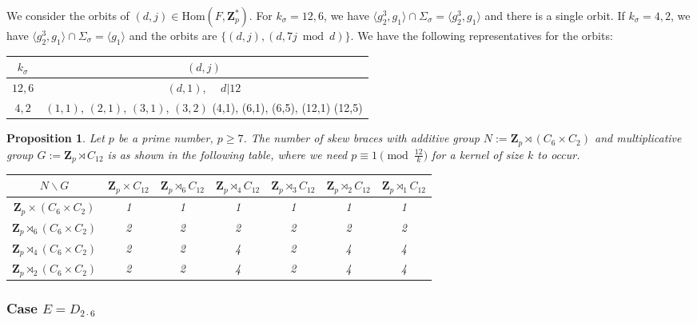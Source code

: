 \documentclass[12pt]{article}
\newtheorem{proposition}[theorem]{Proposition}
\theoremstyle{definition}
\newcommand{\Z}{\mathbf Z}
\newcommand{\Hom}{\mathrm{Hom}}
\begin{document}
	
	We consider the orbits of $(d,j)\in\Hom(F,\Z_p^*)$. 
	For $k_{\sigma}=12,6$, we have $\langle g_2^3,g_1\rangle {\cap}\Sigma_{\sigma}=\langle g_2^3,g_1\rangle$ and there is a single orbit.  If $k_{\sigma}=4,2$, we have $\langle g_2^3,g_1\rangle {\cap}\Sigma_{\sigma}=
	\langle g_1\rangle$ and the orbits are $\{(d,j),(d,7j\bmod d)\}$.
	We have the following representatives for the orbits:
	\begin{center}
		\begin{tabular}{c|c}
			$k_{\sigma}$ &  $(d,j)$   \\[0.5ex]
			\hline
			$12,6$  & $(d,1)$, $\quad d|12$\\
			$4,2$  & $(1,1)$, $(2,1)$, $(3,1)$, $(3,2)$ (4,1),  (6,1),
			(6,5), (12,1) (12,5) \\
		\end{tabular}
	\end{center}
	
	
	\begin{proposition}
		Let $p$ be a prime number, $p\geq 7$. The number of skew braces with additive group $N:=\Z_p \rtimes (C_{6}\times C_{2})$ and multiplicative group $G:=\Z_p\rtimes C_{12}$ is as shown in the following table, where we need $p\equiv 1 \pmod{\frac {12}k}$ for a kernel of size $k$ to occur.
		
		\begin{center}
			
			\begin{tabular}{|c||c|c|c|c|c|c|}
				\hline
				$N \backslash G$ & $\Z_p\times C_{12}$ & $\Z_p\rtimes_{6} C_{12}$ & $\Z_p\rtimes_{4} C_{12}$ & $\Z_p\rtimes_{3} C_{12}$ & $\Z_p\rtimes_{2} C_{12}$& $\Z_p\rtimes_{1} C_{12}$\\
				\hline
				\hline
				$\Z_p\times (C_6\times C_2)$ & 1 & 1&1&1&1&1\\
				\hline
				$\Z_p\rtimes_{6} (C_6\times C_2)$ &2&2&2&2&2&2\\
				\hline
				$\Z_p\rtimes_{4} (C_6\times C_2)$&2 &2&4&2&4&4\\
				\hline
				$\Z_p\rtimes_{2} (C_6\times C_2)$&2 &2&4&2&4&4\\
				\hline
			\end{tabular}
		\end{center}
		
	\end{proposition}
	
	
	
	
	\subsubsection*{Case $E=D_{2\cdot 6}$}
	
\end{document}
